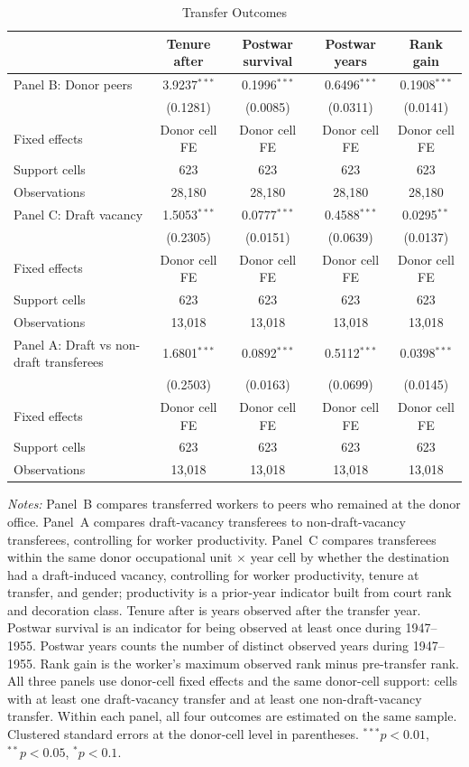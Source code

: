 \begin{table}[htbp]
\centering
\caption{Transfer Outcomes}
\label{tab:transfer-outcomes-combined}
\begin{threeparttable}
\begin{tabular}{lcccc}
\toprule
 & Tenure after & Postwar survival & Postwar years & Rank gain \\
\midrule
Panel B: Donor peers & 3.9237$^{***}$ & 0.1996$^{***}$ & 0.6496$^{***}$ & 0.1908$^{***}$ \\
 & (0.1281) & (0.0085) & (0.0311) & (0.0141) \\
Fixed effects & Donor cell FE & Donor cell FE & Donor cell FE & Donor cell FE \\
Support cells & 623 & 623 & 623 & 623 \\
Observations & 28,180 & 28,180 & 28,180 & 28,180 \\[4pt]
Panel C: Draft vacancy & 1.5053$^{***}$ & 0.0777$^{***}$ & 0.4588$^{***}$ & 0.0295$^{**}$ \\
 & (0.2305) & (0.0151) & (0.0639) & (0.0137) \\
Fixed effects & Donor cell FE & Donor cell FE & Donor cell FE & Donor cell FE \\
Support cells & 623 & 623 & 623 & 623 \\
Observations & 13,018 & 13,018 & 13,018 & 13,018 \\[4pt]
Panel A: Draft vs non-draft transferees & 1.6801$^{***}$ & 0.0892$^{***}$ & 0.5112$^{***}$ & 0.0398$^{***}$ \\
 & (0.2503) & (0.0163) & (0.0699) & (0.0145) \\
Fixed effects & Donor cell FE & Donor cell FE & Donor cell FE & Donor cell FE \\
Support cells & 623 & 623 & 623 & 623 \\
Observations & 13,018 & 13,018 & 13,018 & 13,018 \\[4pt]
\bottomrule
\end{tabular}
\begin{tablenotes}[flushleft]
\footnotesize
\item \textit{Notes:} Panel~B compares transferred workers to peers who remained at the donor office. Panel~A compares draft-vacancy transferees to non-draft-vacancy transferees, controlling for worker productivity. Panel~C compares transferees within the same donor occupational unit $\times$ year cell by whether the destination had a draft-induced vacancy, controlling for worker productivity, tenure at transfer, and gender; productivity is a prior-year indicator built from court rank and decoration class. Tenure after is years observed after the transfer year. Postwar survival is an indicator for being observed at least once during 1947--1955. Postwar years counts the number of distinct observed years during 1947--1955. Rank gain is the worker's maximum observed rank minus pre-transfer rank. All three panels use donor-cell fixed effects and the same donor-cell support: cells with at least one draft-vacancy transfer and at least one non-draft-vacancy transfer. Within each panel, all four outcomes are estimated on the same sample. Clustered standard errors at the donor-cell level in parentheses. $^{***}p<0.01$, $^{**}p<0.05$, $^{*}p<0.1$.

\end{tablenotes}
\end{threeparttable}
\end{table}

